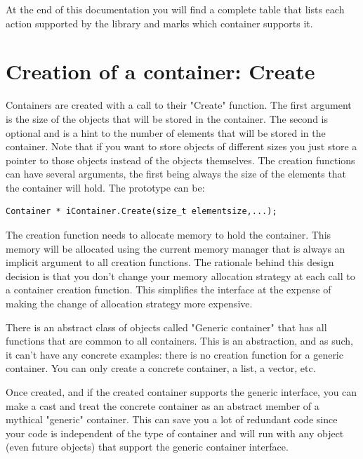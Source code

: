 \documentclass[12pt,a4paper]{memoir} %
\begin{document}
At the end of this documentation you will find a complete table that lists each action supported by the library and marks which container supports it.

\section{Creation of a container: Create}
Containers are created with a call to their "Create" function.  The first argument is the size of the objects that will be stored in the container. The second is optional and is a hint to the number of elements that will be stored in the container.
Note that if you want to store objects of different sizes you just store a pointer to those objects instead of the objects themselves.
The creation functions can have several arguments, the first being always the size of the elements that the container will hold. The prototype can be:
\begin{verbatim}
Container * iContainer.Create(size_t elementsize,...);
\end{verbatim}
The creation function needs to allocate memory to hold the container. This memory will be allocated using the current memory manager that is always an implicit argument to all creation functions. The rationale behind this design decision is that you don't change your memory allocation strategy at each call to a container creation function. This simplifies the interface at the expense of making the change of allocation strategy more expensive.

There is an abstract class of objects called "Generic container" that has all functions that are common to all containers. This is an abstraction,
and as such, it can't have any concrete examples: there is no creation function for a generic container. You can only create a concrete container, a list, a vector, etc. 

Once created, and if the created container supports the generic interface, you can make a cast and treat the concrete container as an abstract member
of a mythical "generic" container. This can save you a lot of redundant code since your code is independent of the type of container and will run
with any object (even future objects) that support the generic container interface.
\end{document}
